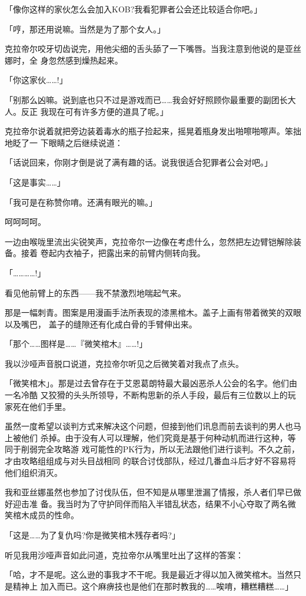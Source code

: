 \documentclass[11pt]{book}
\begin{document}
「像你这样的家伙怎么会加入KOB?我看犯罪者公会还比较适合你吧。」

「哼，那还用说嘛。当然是为了那个女人。」

克拉帝尔咬牙切齿说完，用他尖细的舌头舔了一下嘴唇。当我注意到他说的是亚丝娜时，全
身忽然感到燥热起来。

「你这家伙……!」

「别那么凶嘛。说到底也只不过是游戏而已……我会好好照顾你最重要的副团长大人。反正
我现在可有许多方便的道具了呢。」

克拉帝尔说着就把旁边装着毒水的瓶子捡起来，摇晃着瓶身发出啪嚓啪嚓声。笨拙地眨了一
下眼睛之后继续说道：

「话说回来，你刚才倒是说了满有趣的话。说我很适合犯罪者公会对吧。」

「这是事实……」

「我可是在称赞你唷。还满有眼光的嘛。」

呵呵呵呵。

一边由喉咙里流出尖锐笑声，克拉帝尔一边像在考虑什么，忽然把左边臂铠解除装备。接着
卷起内衣袖子，把露出来的前臂内侧转向我。

「…………!」

看见他前臂上的东西——我不禁激烈地喘起气来。

那是一幅刺青。图案是用漫画手法所表现的漆黑棺木。盖子上画有带着微笑的双眼以及嘴巴，
盖子的缝隙还有化成白骨的手臂伸出来。

「那个……图样是……『微笑棺木』……!」

我以沙哑声音脱口说道，克拉帝尔听见之后微笑着对我点了点头。

「微笑棺木」。那是过去曾存在于艾恩葛朗特最大最凶恶杀人公会的名字。他们由一名冷酷
又狡猾的头头所领导，不断构思新的杀人手段，最后有三位数以上的玩家死在他们手里。

虽然一度希望以谈判方式来解决这个问题，但接到他们讯息而前去谈判的男人也马上被他们
杀掉。由于没有人可以理解，他们究竟是基于何种动机而进行这种，等同于削弱完全攻略游
戏可能性的PK行为，所以无法跟他们进行谈判。不久之前，才由攻略组组成与对头目战相同
的联合讨伐部队，经过几番血斗后才好不容易将他们组织消灭。

我和亚丝娜虽然也参加了讨伐队伍，但不知是从哪里泄漏了情报，杀人者们早已做好迎击准
备。我当时为了守护同伴而陷入半错乱状态，结果不小心夺取了两名微笑棺木成员的性命。

「这是……为了复仇吗?你是微笑棺木残存者吗?」

听见我用沙哑声音如此问道，克拉帝尔从嘴里吐出了这样的答案：

「哈，才不是呢。这么逊的事我才不干呢。我是最近才得以加入微笑棺木。当然只是精神上
加入而已。这个麻痹技也是他们在那时教我的……唉唷，糟糕糟糕……」
\end{document}
